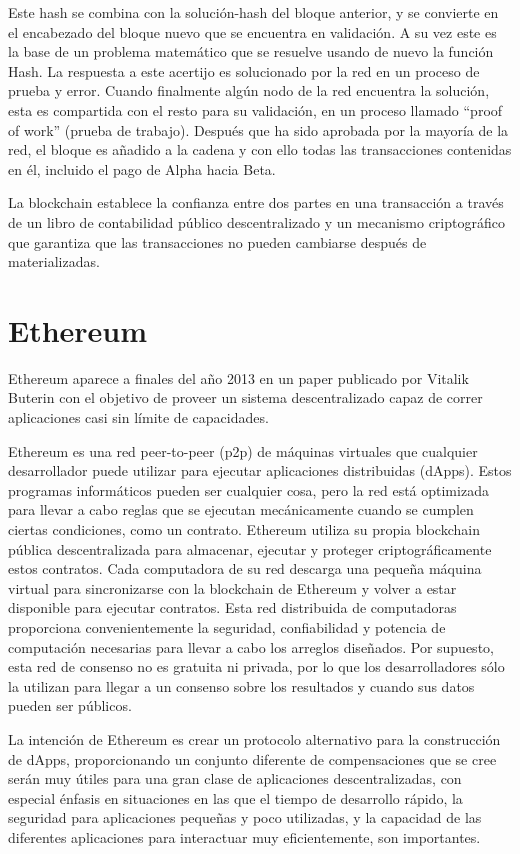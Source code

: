 Este hash se combina con la solución-hash del bloque anterior, y se convierte en el encabezado del
bloque nuevo que se encuentra en validación. A su vez este es la base de un problema matemático que
se resuelve usando de nuevo la función Hash. La respuesta a este acertijo es solucionado por la red
en un proceso de prueba y error. Cuando finalmente algún nodo de la red encuentra la solución, esta
es compartida con el resto para su validación, en un proceso llamado “proof of work” (prueba de
trabajo). Después que ha sido aprobada por la mayoría de la red, el bloque es añadido a la cadena y 
con ello todas las transacciones contenidas en él, incluido el pago de Alpha hacia Beta.

La blockchain establece la confianza entre dos partes en una transacción a través de un libro de 
contabilidad público descentralizado y un mecanismo criptográfico que garantiza que las 
transacciones no pueden cambiarse después de materializadas.

\section{Ethereum}
Ethereum aparece a finales del año 2013 en un paper publicado por Vitalik Buterin con el objetivo
de proveer un sistema descentralizado capaz de correr aplicaciones casi sin límite de capacidades.

Ethereum es una red peer-to-peer (p2p) de máquinas virtuales que cualquier desarrollador puede
utilizar para ejecutar aplicaciones distribuidas (dApps). Estos programas informáticos pueden ser
cualquier cosa, pero la red está optimizada para llevar a cabo reglas que se ejecutan mecánicamente
cuando se cumplen ciertas condiciones, como un contrato. Ethereum utiliza su propia blockchain
pública descentralizada para almacenar, ejecutar y proteger criptográficamente estos contratos. 
Cada computadora de su red descarga una pequeña máquina virtual para sincronizarse con la
blockchain de Ethereum y volver a estar disponible para ejecutar contratos. Esta red distribuida de
computadoras proporciona convenientemente la seguridad, confiabilidad y potencia de computación
necesarias para llevar a cabo los arreglos diseñados. Por supuesto, esta red de consenso no es
gratuita ni privada, por lo que los desarrolladores sólo la utilizan para llegar a un consenso
sobre los resultados y cuando sus datos pueden ser públicos.

La intención de Ethereum es crear un protocolo alternativo para la construcción de dApps,
proporcionando un conjunto diferente de compensaciones que se cree serán muy útiles para una gran
clase de aplicaciones descentralizadas, con especial énfasis en situaciones en las que el tiempo de
desarrollo rápido, la seguridad para aplicaciones pequeñas y poco utilizadas, y la capacidad de las
 diferentes aplicaciones para interactuar muy eficientemente, son importantes.
 

